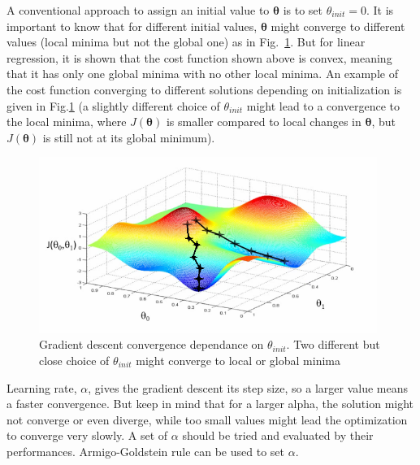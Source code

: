 A conventional approach to assign an initial value to ${\bm{\theta}}$ is to set $\theta_{init} = 0$.
It is important to know that for different initial values, ${\bm{\theta}}$ might converge to different values (local minima but not the global one) as in Fig.~\ref{fig:localOrGlobalMinimaGD}. 
But for linear regression, it is shown that the cost function shown above is convex, meaning that it has only one global minima with no other local minima. An example of the cost function converging to different solutions depending on initialization is given in Fig.\ref{fig:localOrGlobalMinimaGD} (a slightly different choice of $\theta_{init}$ might lead to a convergence to the local minima, where $J(\bm{\theta})$ is smaller compared to local changes in $\bm{\theta}$, but $J(\bm{\theta})$ is still not at its global minimum).

\begin{figure}
\begin{center}
\includegraphics[width=11cm]{figures/localOrGlobalMinimaGD}    %
\caption{Gradient descent convergence dependance on $\theta_{init}$. Two different but close choice of $\theta_{init}$ might converge to local or global minima \cite{andrewNg_MachLearning}} 
\label{fig:localOrGlobalMinimaGD}
\end{center}
\end{figure}
 
Learning rate,  $\alpha$, gives the gradient descent its step size, so a larger value means a faster convergence. 
But keep in mind that for a larger alpha, the solution might not converge or even diverge, while too small values might lead the optimization to converge very slowly.
A set of $\alpha$ should be tried and evaluated by their performances. 
 Armigo-Goldstein rule can be used to set $\alpha$. 

